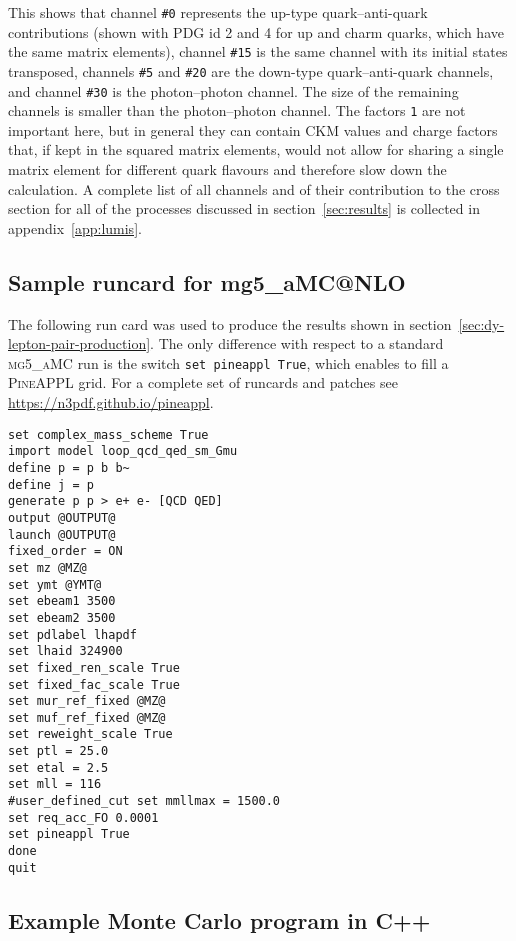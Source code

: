 This shows that channel \texttt{\#0} represents the up-type quark--anti-quark contributions (shown with PDG id 2 and 4 for up and charm quarks, which have the same matrix elements), channel \texttt{\#15} is the same channel with its initial states transposed, channels \texttt{\#5} and \texttt{\#20} are the down-type quark--anti-quark channels, and channel \texttt{\#30} is the photon--photon channel.
The size of the remaining channels is smaller than the photon--photon channel.
The factors \texttt{1} are not important here, but in general they can contain CKM values and charge factors that, if kept in the squared matrix elements, would not allow for sharing a single matrix element for different quark flavours and therefore slow down the calculation.
A complete list of all channels and of their contribution to the cross section for all of the processes discussed in section~\ref{sec:results} is collected in appendix~\ref{app:lumis}.

\subsection{Sample runcard for mg5\_aMC@NLO}
\label{app:sample-runcard}

The following run card was used to produce the results shown in section~\ref{sec:dy-lepton-pair-production}.
The only difference with respect to a standard \textsc{mg5\_aMC} run is the switch \texttt{set pineappl True}, which enables to fill a \textsc{PineAPPL} grid.
For a complete set of runcards and patches see \url{https://n3pdf.github.io/pineappl}.
\begin{verbatim}
set complex_mass_scheme True
import model loop_qcd_qed_sm_Gmu
define p = p b b~
define j = p
generate p p > e+ e- [QCD QED]
output @OUTPUT@
launch @OUTPUT@
fixed_order = ON
set mz @MZ@
set ymt @YMT@
set ebeam1 3500
set ebeam2 3500
set pdlabel lhapdf
set lhaid 324900
set fixed_ren_scale True
set fixed_fac_scale True
set mur_ref_fixed @MZ@
set muf_ref_fixed @MZ@
set reweight_scale True
set ptl = 25.0
set etal = 2.5
set mll = 116
#user_defined_cut set mmllmax = 1500.0
set req_acc_FO 0.0001
set pineappl True
done
quit
\end{verbatim}

\subsection{Example Monte Carlo program in C++}
\label{app:example-program}


